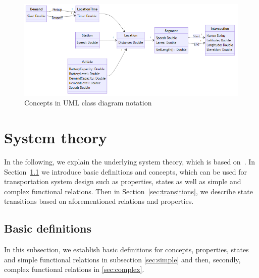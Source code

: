 \documentclass[graybox]{svmult}
\begin{document}
\begin{figure}[t]
	\centering
	\includegraphics[scale=0.35]{../../diagrams/model/classes-v0.png}
	\caption{Concepts in UML class diagram notation}
	\label{fig:concepts}
\end{figure}

\newpage

\section{System theory}
\label{sec:theory}
In the following, we explain the underlying system theory, which is based on~\cite{Ascher2014,Ascher2015,Ascher2016,Ascher2017}.
In Section~\ref{sec:concepts} we introduce basic definitions and concepts, which can be used for transportation system design such as properties, states as well as simple and complex functional relations. Then in Section~\ref{sec:transitions}, we describe state transitions based on aforementioned relations and properties.


\subsection{Basic definitions}
\label{sec:concepts}
In this subsection, we establish basic definitions for concepts, properties, states and simple functional relations in subsection \ref{sec:simple} and then, secondly, complex functional relations in \ref{sec:complex}.
\end{document}
